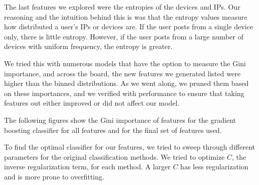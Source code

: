 \documentclass{article} %
\begin{document}
The last features we explored were the entropies of the devices and IPs.
Our reasoning and the intuition behind this is was that the entropy values measure how distributed a user's IPs or devices are.
If the user posts from a single device only, there is little entropy.
However, if the user posts from a large number of devices with uniform frequency, the entropy is greater.

We tried this with numerous models that have the option to measure the Gini importance, and across the board, the new features we generated listed were higher than the binned distributions.
As we went along, we pruned them based on these importances, and we verified with performance to ensure that taking features out either improved or did not affect our model.

The following figures show the Gini importance of features for the gradient boosting classifier for all features and for the final set of features used.

\begin{figure}[h]
    \centering
    \qquad
\end{figure}

To find the optimal classifier for our features, we tried to sweep through different parameters for the original classification methods.
We tried to optimize $C$, the inverse regularization term, for each method.
A larger $C$ has less regularization and is more prone to overfitting.
\end{document}
